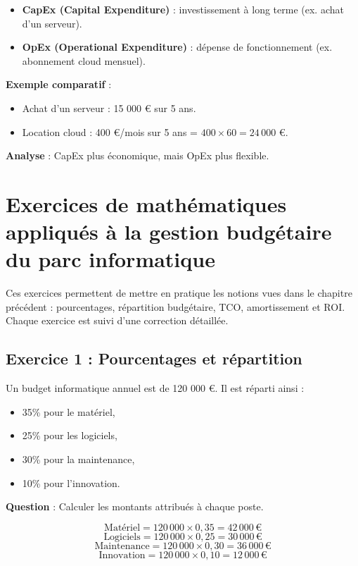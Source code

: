 \documentclass[12pt,a4paper]{report}
\begin{document}
\begin{tcolorbox}[title={Définitions}]
\begin{itemize}
  \item \textbf{CapEx (Capital Expenditure)} : investissement à long terme (ex. achat d’un serveur).
  \item \textbf{OpEx (Operational Expenditure)} : dépense de fonctionnement (ex. abonnement cloud mensuel).
\end{itemize}
\end{tcolorbox}

\textbf{Exemple comparatif} :  
\begin{itemize}
  \item Achat d’un serveur : 15 000 € sur 5 ans.
  \item Location cloud : 400 €/mois sur 5 ans = $400 \times 60 = 24\,000$ €.
\end{itemize}

\textbf{Analyse} : CapEx plus économique, mais OpEx plus flexible.


\chapter{Exercices de mathématiques appliqués à la gestion budgétaire du parc informatique}

\begin{tcolorbox}[title={Objectif}]
Ces exercices permettent de mettre en pratique les notions vues dans le chapitre précédent : pourcentages, répartition budgétaire, TCO, amortissement et ROI.  
Chaque exercice est suivi d’une correction détaillée.
\end{tcolorbox}

\section*{Exercice 1 : Pourcentages et répartition}
Un budget informatique annuel est de 120 000 €.  
Il est réparti ainsi :
\begin{itemize}
  \item 35\% pour le matériel,
  \item 25\% pour les logiciels,
  \item 30\% pour la maintenance,
  \item 10\% pour l’innovation.
\end{itemize}

\textbf{Question} : Calculer les montants attribués à chaque poste.

\begin{tcolorbox}[title={Correction}]
\[
\text{Matériel} = 120\,000 \times 0,35 = 42\,000 \,€
\]
\[
\text{Logiciels} = 120\,000 \times 0,25 = 30\,000 \,€
\]
\[
\text{Maintenance} = 120\,000 \times 0,30 = 36\,000 \,€
\]
\[
\text{Innovation} = 120\,000 \times 0,10 = 12\,000 \,€
\]
\end{tcolorbox}
\end{document}
